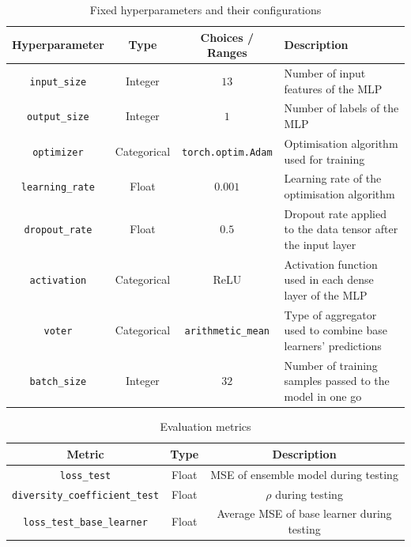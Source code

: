 \begin{table}[H]
    \centering
    \begin{tabular}{|c|c|c|p{5cm}|}
        \hline
        Hyperparameter & Type & Choices / Ranges & Description \\
        \hline
        \small\texttt{input\_size} & Integer & $13$ & Number of input features of the MLP \\
        \hline
        \small\texttt{output\_size} & Integer & $1$ & Number of labels of the MLP \\
        \hline
        \small\texttt{optimizer} & Categorical & \texttt{torch.optim.Adam} & Optimisation algorithm used for training \\
        \hline
        \small\texttt{learning\_rate} & Float & $0.001$ & Learning rate of the optimisation algorithm \\
        \hline
        \small\texttt{dropout\_rate} & Float & $0.5$ & Dropout rate applied to the data tensor after the input layer \\
        \hline
        \small\texttt{activation} & Categorical & ReLU & Activation function used in each dense layer of the MLP \\
        \hline
        \small\texttt{voter} & Categorical & \texttt{arithmetic\_mean} & Type of aggregator used to combine base learners' predictions \\
        \hline
        \small\texttt{batch\_size} & Integer & $32$ & Number of training samples passed to the model in one go \\
        \hline
    \end{tabular}
    \caption{Fixed hyperparameters and their configurations}
    \label{table:experiment_2_fixed_hyperparameters}
\end{table}

\begin{table}[H]
    \centering
    \begin{tabular}{|c|c|c|}
        \hline
        Metric & Type & Description \\
        \hline
        \small\texttt{loss\_test} & Float & MSE of ensemble model during testing \\
        \hline
        \small\texttt{diversity\_coefficient\_test} & Float & $\rho$ during testing \\
        \hline
        \small\texttt{loss\_test\_base\_learner} & Float & Average MSE of base learner during testing \\
        \hline
    \end{tabular}
    \caption{Evaluation metrics}
    \label{table:experiment_2_metric}
\end{table}


